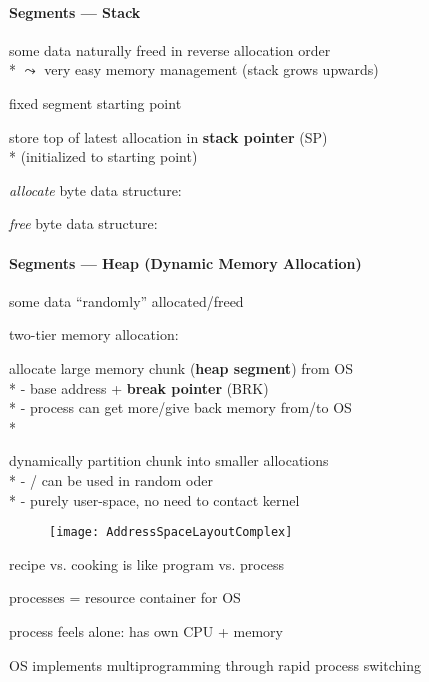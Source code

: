 \paragraph{Segments --- Stack}
\begin{items}
	\item some data naturally freed in reverse allocation order \\*
		\( \leadsto \) very easy memory management (stack grows upwards)
	\item fixed segment starting point
	\item store top of latest allocation in \textbf{stack pointer} (SP) \\*
		(initialized to starting point)
	\item \emph{allocate}  byte data structure: 
	\item \emph{free}  byte data structure: 
\end{items}

\paragraph{Segments --- Heap (Dynamic Memory Allocation)}
\begin{items}
	\item some data "`randomly"' allocated/freed
	\item two-tier memory allocation:
	\begin{enumeration}
		\item allocate large memory chunk (\textbf{heap segment}) from OS \\*
			- base address + \textbf{break pointer} (BRK) \\*
			- process can get more/give back memory from/to OS \\*
		\item dynamically partition chunk into smaller allocations \\*
			- / can be used in random oder \\*
			- purely user-space, no need to contact kernel
	\end{enumeration}
\end{items}

\begin{figure}[H]\centering\label{AddressSpaceLayoutComplex}\texttt{[image: AddressSpaceLayoutComplex]}\end{figure}

\begin{summary}
	\begin{items}
		\item recipe vs. cooking is like program vs. process
		\item processes = resource container for OS
		\item process feels alone: has own CPU + memory
		\item OS implements multiprogramming through rapid process switching
	\end{items}
\end{summary}
